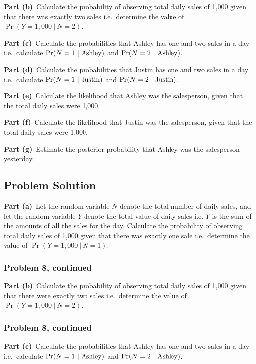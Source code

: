 \documentclass[12pt]{article}
\theoremstyle{definition}
\begin{document}
\bigskip
\noindent
{\bf Part (b)}\ Calculate the probability of observing total daily sales of 1,000 given that there was exactly two sales i.e.\ determine the value of $\Pr(Y = 1,000\ |\ N = 2)$.

\bigskip
\noindent
{\bf Part (c)}\ Calculate the probabilities that Ashley has one and two sales in a day i.e.\ calculate $\Pr(N = 1\ |\ \hbox{Ashley})$ and $\Pr(N = 2\ |\ \hbox{Ashley})$.


\bigskip
\noindent
{\bf Part (d)}\ Calculate the probabilities that Justin has one and two sales in a day i.e.\ calculate $\Pr(N = 1\ |\ \hbox{Justin})$ and $\Pr(N = 2\ |\ \hbox{Justin})$.

\bigskip
\noindent
{\bf Part (e)}\ Calculate the likelihood that Ashley was the salesperson, given that the total daily sales were 1,000.


\bigskip
\noindent
{\bf Part (f)}\ Calculate the likelihood that Justin was the salesperson, given that the total daily sales were 1,000.



\bigskip
\noindent
{\bf Part (g)}\ Estimate the posterior probability that Ashley was the salesperson yesterday.


\subsection*{Problem Solution}

\bigskip
\noindent
{\bf Part (a)}\ Let the random variable $N$ denote the total number of daily sales, and let the random variable $Y$ denote the total value of daily sales i.e. $Y$ is the sum of the amounts of all the sales for the day. Calculate the probability of observing total daily sales of 1,000 given that there was exactly one sale i.e.\ determine the value of $\Pr(Y = 1,000\ |\ N = 1)$.






\newpage
\subsubsection*{Problem 8, continued}
\noindent
{\bf Part (b)}\ Calculate the probability of observing total daily sales of 1,000 given that there were exactly two sales i.e.\ determine the value of $\Pr(Y = 1,000\ |\ N = 2)$.

\newpage
\subsubsection*{Problem 8, continued}
\noindent
{\bf Part (c)}\ Calculate the probabilities that Ashley has one and two sales in a day i.e.\ calculate $\Pr(N = 1\ |\ \hbox{Ashley})$ and $\Pr(N = 2\ |\ \hbox{Ashley})$.
\end{document}
